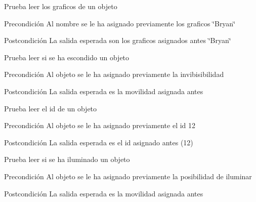 \begin{DoxyRefList}
\item[\label{test__test000183}%
\hypertarget{test__test000183}{}%
Global \hyperlink{object__test_8c_a8da5a07a844277fd4910a950e4f1fa4f}{test1\-\_\-object\-\_\-\-Get\-\_\-\-Graphics} ()]Prueba leer los graficos de un objeto \begin{DoxyPrecond}{Precondición}
Al nombre se le ha asignado previamente los graficos \char`\"{}\-Bryan\char`\"{} 
\end{DoxyPrecond}
\begin{DoxyPostcond}{Postcondición}
La salida esperada son los graficos asignados antes \char`\"{}\-Bryan\char`\"{}  
\end{DoxyPostcond}

\item[\label{test__test000195}%
\hypertarget{test__test000195}{}%
Global \hyperlink{object__test_8c_aacbcd57a70ae828d778590c6f03cb606}{test1\-\_\-object\-\_\-\-Get\-\_\-\-Hidden} ()]Prueba leer si se ha escondido un objeto \begin{DoxyPrecond}{Precondición}
Al objeto se le ha asignado previamente la invibisibilidad 
\end{DoxyPrecond}
\begin{DoxyPostcond}{Postcondición}
La salida esperada es la movilidad asignada antes  
\end{DoxyPostcond}

\item[\label{test__test000185}%
\hypertarget{test__test000185}{}%
Global \hyperlink{object__test_8c_a5c47b5c3c7f5b6204266822de3f2dd25}{test1\-\_\-object\-\_\-\-Get\-\_\-\-Id} ()]Prueba leer el id de un objeto \begin{DoxyPrecond}{Precondición}
Al objeto se le ha asignado previamente el id 12 
\end{DoxyPrecond}
\begin{DoxyPostcond}{Postcondición}
La salida esperada es el id asignado antes (12)  
\end{DoxyPostcond}

\item[\label{test__test000199}%
\hypertarget{test__test000199}{}%
Global \hyperlink{object__test_8c_a19f525ed65f609a8c17eb620de528d42}{test1\-\_\-object\-\_\-\-Get\-\_\-\-Illuminates} ()]Prueba leer si se ha iluminado un objeto \begin{DoxyPrecond}{Precondición}
Al objeto se le ha asignado previamente la posibilidad de iluminar 
\end{DoxyPrecond}
\begin{DoxyPostcond}{Postcondición}
La salida esperada es la movilidad asignada antes  
\end{DoxyPostcond}


\end{DoxyRefList}
